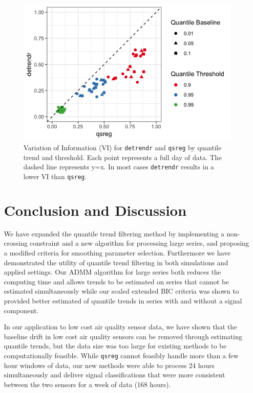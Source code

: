 \documentclass[aoas]{imsart}
\begin{document}
\begin{figure}
	\includegraphics[width = 0.6\linewidth]{Figures/VI_by_day.png}
	\caption{Variation of Information (VI) for \texttt{detrendr} and \texttt{qsreg} by quantile trend and threshold. Each point represents a full day of data. The dashed line represents y=x. In most cases \texttt{detrendr} results in a lower VI than \texttt{qsreg}.}
	\label{fig:vi_week}
\end{figure}



\section{Conclusion and Discussion}
\label{sec:discussion}

We have expanded the quantile trend filtering method by implementing a non-crossing constraint and a new algorithm for processing large series, and proposing a modified criteria for smoothing parameter selection. Furthermore we have demonstrated the utility of quantile trend filtering in both simulations and applied settings. Our ADMM algorithm for large series both reduces the computing time and allows trends to be estimated on series that cannot be estimated simultaneously while our scaled extended BIC criteria was shown to provided better estimated of quantile trends in series with and without a signal component. 

In our application to low cost air quality sensor data, we have shown that the baseline drift in low cost air quality sensors can be removed through estimating quantile trends, but the data size was too large for existing methods to be computationally feasible. While \texttt{qsreg} cannot feasibly handle more than a few hour windows of data, our new methods were able to process 24 hours simultaneously and deliver signal classifications that were more consistent between the two sensors for a week of data (168 hours). 
\end{document}
